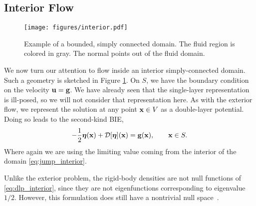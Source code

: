 \subsection{Interior Flow}\label{sec:interior}


\begin{figure}[!h]
\begin{center}
	\texttt{[image: figures/interior.pdf]}
\caption[Sketch of a simply connected interior domain]{Example of a bounded, simply connected domain. The fluid region is colored in gray. The normal points out of the fluid domain.}\label{fig:interior}
\end{center}
\end{figure}

We now turn our attention to flow inside an interior simply-connected domain. Such a geometry is sketched in Figure \ref{fig:interior}. On $S$, we have the boundary condition on the velocity ${\mathbf{u}} = \mathbf{g}$.  We have already seen that the single-layer representation is ill-posed, so we will not consider that representation here. As with the exterior flow, we represent the solution at any point ${\mathbf{x}}\in V$ as a double-layer potential. Doing so leads to the second-kind BIE,
\begin{equation}\label{eq:dlp_interior}  -\frac{1}{2}\bm{\eta}({\mathbf{x}}) + \mathcal{D}[\bm{\eta}]({\mathbf{x}})  = \mathbf{g}({\mathbf{x}}),\qquad {\mathbf{x}}\in S.\end{equation}
Where again we are using the limiting value coming from the interior of the domain \eqref{eq:jump_interior}. 

Unlike the exterior problem, the rigid-body densities are not null functions of \eqref{eq:dlp_interior}, since they are not eigenfunctions corresponding to eigenvalue $1/2$. However, this formulation does still have a nontrivial null space~\cite{Ladyzhenskaya1963,Power1993,Karrila1989}. 

